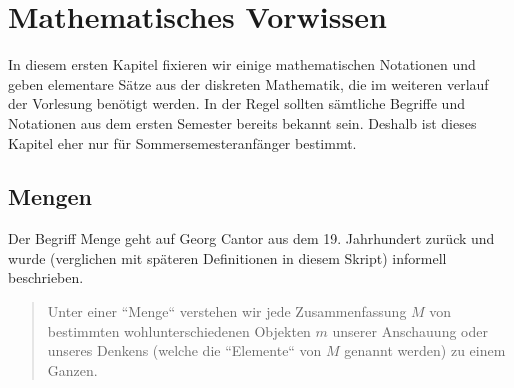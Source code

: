 \documentclass[11pt, a4paper]{article}
\theoremstyle{definition}
\theoremstyle{plain}
\numberwithin{equation}{section}
\begin{document}
\newpage
\tableofcontents


\newpage
\pagestyle{headings}
\section{Mathematisches Vorwissen}\label{sec:pre}
In diesem ersten Kapitel fixieren wir einige mathematischen Notationen und geben elementare Sätze aus der diskreten Mathematik, die im weiteren verlauf der Vorlesung benötigt werden. In der Regel sollten sämtliche Begriffe und Notationen aus dem ersten Semester bereits bekannt sein. Deshalb ist dieses Kapitel eher nur für Sommersemesteranfänger bestimmt.


\subsection{Mengen}\label{sec:pre_sets}
Der Begriff Menge geht auf Georg Cantor aus dem 19. Jahrhundert zurück und wurde (verglichen mit späteren Definitionen in diesem Skript) informell beschrieben.
\begin{quote}
	Unter einer ``Menge`` verstehen wir jede Zusammenfassung \( M \) von bestimmten wohlunterschiedenen Objekten \( m \) unserer Anschauung oder unseres Denkens (welche die ``Elemente`` von \( M \) genannt werden) zu einem Ganzen.
\end{quote}
\end{document}
